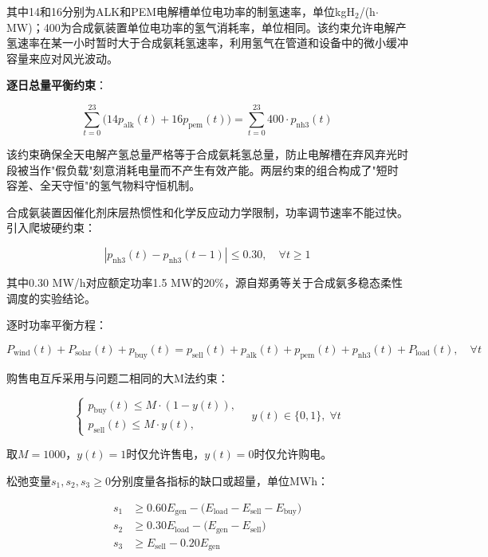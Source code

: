 \documentclass[zihao=-4,a4paper]{ctexart} %
\begin{document}
	其中14和16分别为ALK和PEM电解槽单位电功率的制氢速率，单位kgH$_2$/(h$\cdot$MW)；400为合成氨装置单位电功率的氢气消耗率，单位相同。该约束允许电解产氢速率在某一小时暂时大于合成氨耗氢速率，利用氢气在管道和设备中的微小缓冲容量来应对风光波动。
	
	\textbf{逐日总量平衡约束}：
	
	\begin{equation}
		\sum_{t=0}^{23} \bigl(14 p_{\text{alk}}(t) + 16 p_{\text{pem}}(t)\bigr) = \sum_{t=0}^{23} 400 \cdot p_{\text{nh3}}(t)
		\label{eq:h2_daily}
	\end{equation}
	
	该约束确保全天电解产氢总量严格等于合成氨耗氢总量，防止电解槽在弃风弃光时段被当作"假负载"刻意消耗电量而不产生有效产能。两层约束的组合构成了"短时容差、全天守恒"的氢气物料守恒机制。
	
	合成氨装置因催化剂床层热惯性和化学反应动力学限制，功率调节速率不能过快。引入爬坡硬约束：
	
	\begin{equation}
		|p_{\text{nh3}}(t) - p_{\text{nh3}}(t-1)| \leq 0.30, \quad \forall t \geq 1
		\label{eq:ramp}
	\end{equation}
	
	其中0.30 MW/h对应额定功率1.5 MW的20\%，源自郑勇等\cite{1}关于合成氨多稳态柔性调度的实验结论。
	
	逐时功率平衡方程：
	
	\begin{equation}
		P_{\text{wind}}(t) + P_{\text{solar}}(t) + p_{\text{buy}}(t) = p_{\text{sell}}(t) + p_{\text{alk}}(t) + p_{\text{pem}}(t) + p_{\text{nh3}}(t) + P_{\text{load}}(t), \quad \forall t
		\label{eq:q3_balance}
	\end{equation}
	
	购售电互斥采用与问题二相同的大M法约束：
	
	\begin{equation}
		\begin{cases}
			p_{\text{buy}}(t) \leq M \cdot (1 - y(t)), \\[4pt]
			p_{\text{sell}}(t) \leq M \cdot y(t),
		\end{cases}
		\quad y(t) \in \{0,1\}, \; \forall t
		\label{eq:q3_bigm}
	\end{equation}
	
	取$M = 1000$，$y(t)=1$时仅允许售电，$y(t)=0$时仅允许购电。
	
	松弛变量$s_1,s_2,s_3 \geq 0$分别度量各指标的缺口或超量，单位MWh：
	
	\begin{align}
		s_1 &\geq 0.60 E_{\text{gen}} - \bigl(E_{\text{load}} - E_{\text{sell}} - E_{\text{buy}}\bigr) \label{eq:q3_slack1}\\
		s_2 &\geq 0.30 E_{\text{load}} - \bigl(E_{\text{gen}} - E_{\text{sell}}\bigr) \label{eq:q3_slack2}\\
		s_3 &\geq E_{\text{sell}} - 0.20 E_{\text{gen}} \label{eq:q3_slack3}
	\end{align}
	
\end{document}
